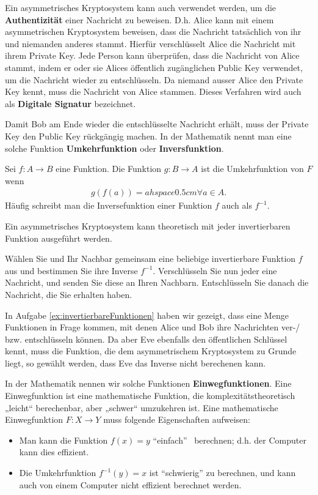 	Ein asymmetrisches Kryptosystem kann auch verwendet werden, um die \textbf{Authentizität} einer Nachricht zu beweisen. D.h. Alice kann mit einem asymmetrischen Kryptosystem beweisen, dass die Nachricht tatsächlich von ihr und niemanden anderes stammt. Hierfür verschlüsselt Alice die Nachricht mit ihrem Private Key. Jede Person kann überprüfen, dass die Nachricht von Alice stammt, indem er oder sie Alices öffentlich zugänglichen Public Key verwendet, um die Nachricht wieder zu entschlüsseln. Da niemand ausser Alice den Private Key kennt, muss die Nachricht von Alice stammen. Dieses Verfahren wird auch als \textbf{Digitale Signatur} bezeichnet.

	Damit Bob am Ende wieder die entschlüsselte Nachricht erhält, muss der Private Key den Public Key rückgängig machen. In der Mathematik nennt man eine solche Funktion \textbf{Umkehrfunktion} oder \textbf{Inversfunktion}. 
	\begin{mydefinition}[Umkehrfunktion]
		Sei $f:A\rightarrow B$ eine Funktion. Die Funktion $g:B\rightarrow A$ ist die Umkehrfunktion von $F$ wenn
		\begin{align*}
			g(f(a)) = a hspace{0.5cm}\forall a\in A.
		\end{align*}
		Häufig schreibt man die Inversefunktion einer Funktion $f$ auch als $f^{-1}$. 
	\end{mydefinition}

	Ein asymmetrisches Kryptosystem kann theoretisch mit jeder invertierbaren Funktion ausgeführt werden. 

	\begin{myexercise}\label{ex:invertierbareFunktionen}
		Wählen Sie und Ihr Nachbar gemeinsam eine beliebige invertierbare Funktion $f$ aus und bestimmen Sie ihre Inverse $f^{-1}$. Verschlüsseln Sie nun jeder eine Nachricht, und senden Sie diese an Ihren Nachbarn. Entschlüsseln Sie danach die Nachricht, die Sie erhalten haben.
	\end{myexercise}

	In Aufgabe \ref{ex:invertierbareFunktionen} haben wir gezeigt, dass eine Menge Funktionen in Frage kommen, mit denen Alice und Bob ihre Nachrichten ver-/ bzw. entschlüsseln können. Da aber Eve ebenfalls den öffentlichen Schlüssel kennt, muss die Funktion, die dem asymmetrischem Kryptosystem zu Grunde liegt, so gewählt werden, dass Eve das Inverse nicht berechenen kann. 
	
	In der Mathematik nennen wir solche Funktionen \textbf{Einwegfunktionen}. Eine Einwegfunktion ist eine mathematische Funktion, die komplexitätstheoretisch „leicht“ berechenbar, aber „schwer“ umzukehren ist. Eine mathematische Einwegfunktion $F:X\rightarrow Y$ muss folgende Eigenschaften aufweisen:
	\begin{itemize}
		\item Man kann die Funktion $f(x)=y$ ``einfach'' \ berechnen; d.h. der Computer kann dies effizient. 
		\item Die Umkehrfunktion $f^{-1}(y)=x$ ist ``schwierig'' zu berechnen, und kann auch von einem Computer nicht effizient berechnet werden.
	\end{itemize}
	
